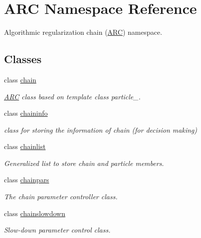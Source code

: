 \hypertarget{namespaceARC}{}\section{A\+RC Namespace Reference}
\label{namespaceARC}


Algorithmic regularization chain (\hyperlink{namespaceARC}{A\+RC}) namespace.  


\subsection*{Classes}
\begin{DoxyCompactItemize}
\item 
class \hyperlink{classARC_1_1chain}{chain}
\begin{DoxyCompactList}\small\item\em \hyperlink{namespaceARC}{A\+RC} class based on template class particle\+\_\+. \end{DoxyCompactList}\item 
class \hyperlink{classARC_1_1chaininfo}{chaininfo}
\begin{DoxyCompactList}\small\item\em class for storing the information of chain (for decision making) \end{DoxyCompactList}\item 
class \hyperlink{classARC_1_1chainlist}{chainlist}
\begin{DoxyCompactList}\small\item\em Generalized list to store chain and particle members. \end{DoxyCompactList}\item 
class \hyperlink{classARC_1_1chainpars}{chainpars}
\begin{DoxyCompactList}\small\item\em The chain parameter controller class. \end{DoxyCompactList}\item 
class \hyperlink{classARC_1_1chainslowdown}{chainslowdown}
\begin{DoxyCompactList}\small\item\em Slow-\/down parameter control class. \end{DoxyCompactList}\end{DoxyCompactItemize}

